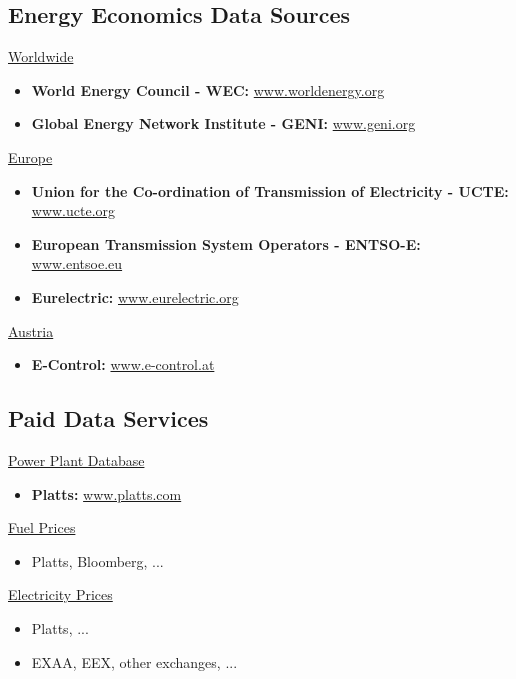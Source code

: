 \documentclass[a4paper, fleqn, headsepline, footsepline, 12pt, parskip=half]{scrartcl}
\begin{document}
\subsection{Energy Economics Data Sources}
\label{sec:energyEconomicsDataSources}

\underline{Worldwide}
\begin{itemize}
    \item \textbf{World Energy Council - WEC:} \url{www.worldenergy.org}
    \item \textbf{Global Energy Network Institute - GENI:} \url{www.geni.org}
\end{itemize}

\underline{Europe}
\begin{itemize}
    \item \textbf{Union for the Co-ordination of Transmission of Electricity - UCTE:} \url{www.ucte.org}
    \item \textbf{European Transmission System Operators - ENTSO-E:} \url{www.entsoe.eu}
    \item \textbf{Eurelectric:} \url{www.eurelectric.org}
\end{itemize}

\underline{Austria}
\begin{itemize}
    \item \textbf{E-Control:} \url{www.e-control.at}
\end{itemize}


\subsection{Paid Data Services}
\label{sec:paidDataServices}

\underline{Power Plant Database}
\begin{itemize}
    \item \textbf{Platts:} \url{www.platts.com}
\end{itemize}

\underline{Fuel Prices}
\begin{itemize}
    \item Platts, Bloomberg, ...
\end{itemize}

\underline{Electricity Prices}
\begin{itemize}
    \item Platts, ...
    \item EXAA, EEX, other exchanges, ...
\end{itemize}
\end{document}
